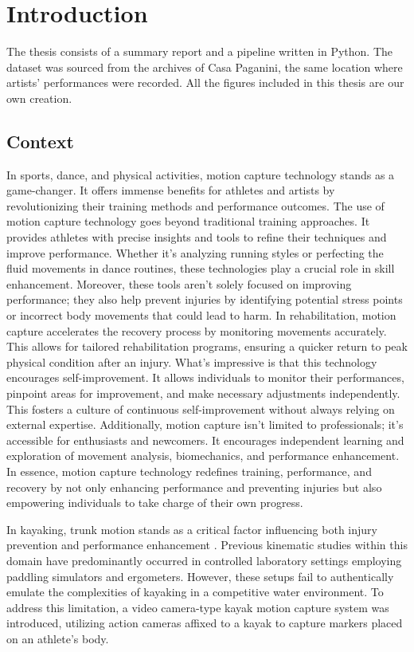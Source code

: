 \chapter{Introduction}
The thesis consists of a summary report and a pipeline written in Python.
The dataset was sourced from the archives of Casa Paganini, the same location where artists' performances were recorded. 
All the figures included in this thesis are our own creation.

\section{Context}
In sports, dance, and physical activities, motion capture technology stands as a game-changer.
It offers immense benefits for athletes and artists by revolutionizing their training methods and performance outcomes.
The use of motion capture technology goes beyond traditional training approaches.
It provides athletes with precise insights and tools to refine their techniques and improve performance.
Whether it's analyzing running styles or perfecting the fluid movements in dance routines, these technologies play a crucial role in skill enhancement.
Moreover, these tools aren't solely focused on improving performance; they also help prevent injuries by identifying potential stress points or incorrect body movements that could lead to harm.
In rehabilitation, motion capture accelerates the recovery process by monitoring movements accurately. This allows for tailored rehabilitation programs, ensuring a quicker return to peak physical condition after an injury.
What's impressive is that this technology encourages self-improvement.
It allows individuals to monitor their performances, pinpoint areas for improvement, and make necessary adjustments independently. This fosters a culture of continuous self-improvement without always relying on external expertise.
Additionally, motion capture isn't limited to professionals; it's accessible for enthusiasts and newcomers. It encourages independent learning and exploration of movement analysis, biomechanics, and performance enhancement.
In essence, motion capture technology redefines training, performance, and recovery by not only enhancing performance and preventing injuries but also empowering individuals to take charge of their own progress.


In kayaking, trunk motion stands as a critical factor influencing both injury prevention and performance enhancement \cite{kayak}.
Previous kinematic studies within this domain have predominantly occurred in controlled laboratory settings employing paddling simulators and ergometers.
However, these setups fail to authentically emulate the complexities of kayaking in a competitive water environment.
To address this limitation, a video camera-type kayak motion capture system was introduced, utilizing action cameras affixed to a kayak to capture markers placed on an athlete's body.

